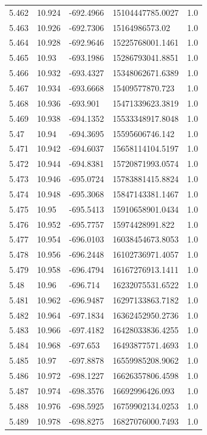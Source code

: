 \begin{tabular}{lllll}
5.462 & 10.924 & -692.4966 & 15104447785.0027 & 1.0 \\
5.463 & 10.926 & -692.7306 & 15164986573.02 & 1.0 \\
5.464 & 10.928 & -692.9646 & 15225768001.1461 & 1.0 \\
5.465 & 10.93 & -693.1986 & 15286793041.8851 & 1.0 \\
5.466 & 10.932 & -693.4327 & 15348062671.6389 & 1.0 \\
5.467 & 10.934 & -693.6668 & 15409577870.723 & 1.0 \\
5.468 & 10.936 & -693.901 & 15471339623.3819 & 1.0 \\
5.469 & 10.938 & -694.1352 & 15533348917.8048 & 1.0 \\
5.47 & 10.94 & -694.3695 & 15595606746.142 & 1.0 \\
5.471 & 10.942 & -694.6037 & 15658114104.5197 & 1.0 \\
5.472 & 10.944 & -694.8381 & 15720871993.0574 & 1.0 \\
5.473 & 10.946 & -695.0724 & 15783881415.8824 & 1.0 \\
5.474 & 10.948 & -695.3068 & 15847143381.1467 & 1.0 \\
5.475 & 10.95 & -695.5413 & 15910658901.0434 & 1.0 \\
5.476 & 10.952 & -695.7757 & 15974428991.822 & 1.0 \\
5.477 & 10.954 & -696.0103 & 16038454673.8053 & 1.0 \\
5.478 & 10.956 & -696.2448 & 16102736971.4057 & 1.0 \\
5.479 & 10.958 & -696.4794 & 16167276913.1411 & 1.0 \\
5.48 & 10.96 & -696.714 & 16232075531.6522 & 1.0 \\
5.481 & 10.962 & -696.9487 & 16297133863.7182 & 1.0 \\
5.482 & 10.964 & -697.1834 & 16362452950.2736 & 1.0 \\
5.483 & 10.966 & -697.4182 & 16428033836.4255 & 1.0 \\
5.484 & 10.968 & -697.653 & 16493877571.4693 & 1.0 \\
5.485 & 10.97 & -697.8878 & 16559985208.9062 & 1.0 \\
5.486 & 10.972 & -698.1227 & 16626357806.4598 & 1.0 \\
5.487 & 10.974 & -698.3576 & 16692996426.093 & 1.0 \\
5.488 & 10.976 & -698.5925 & 16759902134.0253 & 1.0 \\
5.489 & 10.978 & -698.8275 & 16827076000.7493 & 1.0 \\

\end{tabular}
